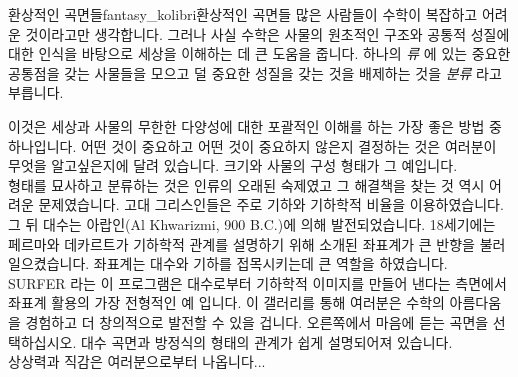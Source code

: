 \begin{surferIntroPage}{환상적인 곡면들}{fantasy_kolibri}{환상적인 곡면들}
많은 사람들이 수학이 복잡하고 어려운 것이라고만 생각합니다. 그러나 사실 수학은 사물의 원초적인 구조와 공통적 성질에 대한 인식을 바탕으로 세상을 이해하는 데 큰 도움을 줍니다. 하나의 \textit{류} 에 있는 중요한 공통점을 갖는 사물들을 모으고 덜 중요한 성질을 갖는 것을 배제하는 것을 \textit{분류} 라고 부릅니다. 

이것은 세상과 사물의 무한한 다양성에 대한 포괄적인 이해를 하는 가장 좋은 방법 중 하나입니다. 어떤 것이 중요하고 어떤 것이 중요하지 않은지 결정하는 것은 여러분이 무엇을 알고싶은지에 달려 있습니다. 크기와 사물의 구성 형태가 그 예입니다.
\\
\vspace{0.4cm}
형태를 묘사하고 분류하는 것은 인류의 오래된 숙제였고 그 해결책을 찾는 것 역시 어려운 문제였습니다. 고대 그리스인들은 주로 기하와 기하학적 비율을 이용하였습니다. 그 뒤 대수는 아랍인(Al Khwarizmi, 900 B.C.)에 의해 발전되었습니다. 18세기에는 페르마와 데카르트가 기하학적 관계를 설명하기 위해 소개된 좌표계가 큰 반향을 불러일으켰습니다. 좌표계는 대수와 기하를 접목시키는데 큰 역할을 하였습니다.
\\
\vspace{0.4cm}
SURFER 라는 이 프로그램은 대수로부터 기하학적 이미지를 만들어 낸다는 측면에서 좌표계 활용의 가장 전형적인 예 입니다.  이 갤러리를 통해 여러분은 수학의 아름다움을 경험하고 더 창의적으로 발전할 수 있을 겁니다. 오른쪽에서 마음에 듣는 곡면을 선택하십시오. 대수 곡면과 방정식의 형태의 관계가 쉽게 설명되어져 있습니다. \\
상상력과 직감은 여러분으로부터 나옵니다...
\end{surferIntroPage}
